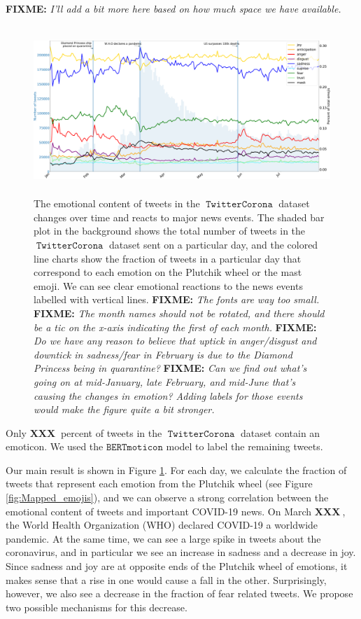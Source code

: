 \documentclass[11pt]{article}
\newcommand{\fixme}[1]{{\color{red} \textbf{FIXME:} {\textit {#1}}}}
\newcommand{\XXX}{{\textbf{XXX}}~}
\newcommand{\bertmoji}{\texttt{BERTmoticon}}
\DeclareMathOperator{\corona}{\texttt{TwitterCorona}}
\begin{document}
\fixme{I'll add a bit more here based on how much space we have available.}

\begin{figure}
    \centering
    \includegraphics[width=\textwidth,height=2.5in]{images/twitter_graph_fix.pdf}
    \caption{
        The emotional content of tweets in the $\corona$ dataset changes over time and reacts to major news events.
        The shaded bar plot in the background shows the total number of tweets in the $\corona$ dataset sent on a particular day,
        and the colored line charts show the fraction of tweets in a particular day that correspond to each emotion on the Plutchik wheel or the mast emoji.
        We can see clear emotional reactions to the news events labelled with vertical lines.
        \fixme{The fonts are way too small.}
        \fixme{The month names should not be rotated, and there should be a tic on the x-axis indicating the first of each month.}
        \fixme{
            Do we have any reason to believe that uptick in anger/disgust and downtick in sadness/fear in February is due to the Diamond Princess being in quarantine?
        }
        \fixme{
            Can we find out what's going on at mid-January, late February, and mid-June that's causing the changes in emotion?
            Adding labels for those events would make the figure quite a bit stronger.
        }
    }
    \label{fig:tweets_per_day_sent}
\end{figure}

Only $\XXX$ percent of tweets in the $\corona$ dataset contain an emoticon.
We used the $\bertmoji$ model to label the remaining tweets.

Our main result is shown in Figure \ref{fig:tweets_per_day_sent}.
For each day, we calculate the fraction of tweets that represent each emotion from the Plutchik wheel (see Figure \ref{fig:Mapped_emojis}),
and we can observe a strong correlation between the emotional content of tweets and important COVID-19 news.
On March $\XXX$, the World Health Organization (WHO) declared COVID-19 a worldwide pandemic.
At the same time, we can see a large spike in tweets about the coronavirus,
and in particular we see an increase in sadness and a decrease in joy.
Since sadness and joy are at opposite ends of the Plutchik wheel of emotions,
it makes sense that a rise in one would cause a fall in the other.
Surprisingly, however, we also see a decrease in the fraction of fear related tweets.
We propose two possible mechanisms for this decrease.
\end{document}

